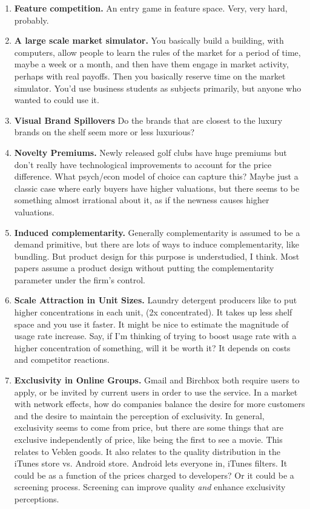 \documentclass[paper=a4, fontsize=11pt]{scrartcl} %
\numberwithin{equation}{section} %
\numberwithin{figure}{section} %
\numberwithin{table}{section} %
\begin{document}
\begin{enumerate}
\item \textbf{Feature competition.}  An entry game in feature space.  Very, very hard, probably. 

\item \textbf{A large scale market simulator.}  You basically build a building, with computers, allow people to learn the rules of the market for a period of time, maybe a week or a month, and then have them engage in market activity, perhaps with real payoffs.  Then you basically reserve time on the market simulator.  You'd use business students as subjects primarily, but anyone who wanted to could use it.

\item \textbf{Visual Brand Spillovers}  Do the brands that are closest to the luxury brands on the shelf seem more or less luxurious?

\item \textbf{Novelty Premiums.}  Newly released golf clubs have huge premiums but don't really have technological improvements to account for the price difference.  What psych/econ model of choice can capture this?  Maybe just a classic case where early buyers have higher valuations, but there seems to be something almost irrational about it, as if the newness causes higher valuations.  
   
\item \textbf{Induced complementarity.}  Generally complementarity is assumed to be a demand primitive, but there are lots of ways to induce complementarity, like bundling.  But product design for this purpose is understudied, I think.  Most papers assume a product design without putting the complementarity parameter under the firm's control.

\item \textbf{Scale Attraction in Unit Sizes.}  Laundry detergent producers like to put higher concentrations in each unit, (2x concentrated).  It takes up less shelf space and you use it faster.  It might be nice to estimate the magnitude of usage rate increase.  Say, if I'm thinking of trying to boost usage rate with a higher concentration of something, will it be worth it?  It depends on costs and competitor reactions.

\item \textbf{Exclusivity in Online Groups.}  Gmail and Birchbox both require users to apply, or be invited by current users in order to use the service.  In a market with network effects, how do companies balance the desire for more customers and the desire to maintain the perception of exclusivity.  In general, exclusivity seems to come from price, but there are some things that are exclusive independently of price, like being the first to see a movie.  This relates to Veblen goods.  It also relates to the quality distribution in the iTunes store vs. Android store.  Android lets everyone in, iTunes filters.  It could be as a function of the prices charged to developers?  Or it could be a screening process.  Screening can improve quality \textit{and} enhance exclusivity perceptions. 


\end{enumerate}
\end{document}

